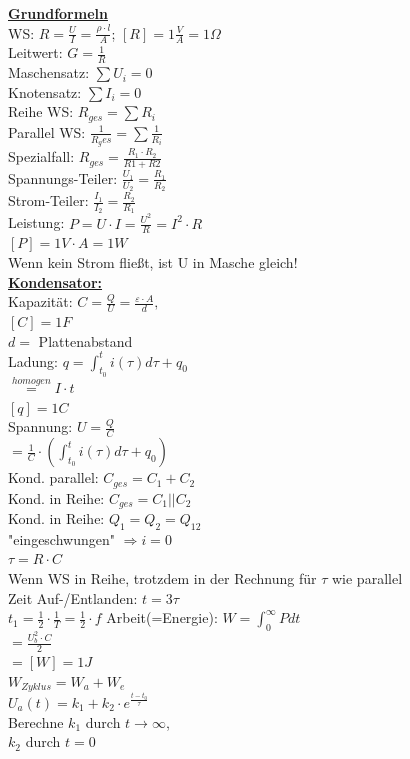 \documentclass[11pt]{article}
\begin{document}
\begin{minipage}{0.45\textwidth}

\underline{\textbf{Grundformeln}}\\
WS: $R = \frac{U}{I} = \frac{\rho \cdot l}{A}$; $[R] = 1\frac{V}{A} =1 \Omega$\\
Leitwert: $G = \frac{1}{R}$\\
Maschensatz: $\sum U_i = 0$\\
Knotensatz: $\sum I_i = 0$\\
Reihe WS: $R_{ges} = \sum R_i$\\
Parallel WS: $\frac{1}{R_ges} = \sum \frac{1}{R_i}$\\
\phantom{ss} Spezialfall: $R_{ges} = \frac{R_1 \cdot R_2}{R1+R2} $\\
Spannungs-Teiler: $\frac{U_1}{U_2} = \frac{R_1}{R_2}$\\
Strom-Teiler: $\frac{I_1}{I_2} = \frac{R_2}{R_1}$\\
Leistung: $P =U \cdot I = \frac{U^2}{R} = I^2 \cdot R $ \\
\phantom{ssssssssss} $[P] = 1V \cdot A =1 W$\\
Wenn kein Strom fließt, ist U in Masche gleich!\\

\underline{\textbf{Kondensator:}}\\
Kapazität: $C = \frac{Q}{U} = \frac{\varepsilon \cdot A }{d},$\\
\phantom{ssssssssssii} $[C]=1F$\\
\phantom{sssssssssssii} $d =$ Plattenabstand\\
Ladung: $q = \int_{t_0}^t i(\tau) d\tau + q_0$\\
\phantom{sssssssis} $\stackrel{homogen}{=} I \cdot t$\\
\phantom{ssssssssssii} $[q]=1C$\\
Spannung: $U = \frac{Q}{C}$\\
\phantom{ssi} $= \frac{1}{C} \cdot (\int_{t_0}^t i(\tau) d\tau + q_0)$\\
Kond. parallel: $C_{ges} = C_1 + C_2$\\
Kond. in Reihe: $C_{ges} = C_1 || C_2$\\
Kond. in Reihe: $Q_1 = Q_2 = Q_{12}$\\
"eingeschwungen" $\Rightarrow i = 0$\\
$\tau = R \cdot C$\\
Wenn WS in Reihe, trotzdem in der Rechnung für $\tau$ wie parallel\\
Zeit Auf-/Entlanden: $t = 3\tau$\\
$t_1 = \frac{1}{2} \cdot \frac{1}{T} = \frac{1}{2} \cdot f$
Arbeit(=Energie): $W = \int_0^\infty P dt$\\
\phantom{sssssssss} $= \frac{U_b^2 \cdot C}{2} $\\
\phantom{sssssssss} $= [W] = 1J $\\
$W_{Zyklus} = W_a + W_e$\\
$U_a(t) = k_1 + k_2 \cdot e^{\frac{t-t_0}{\tau}}$\\
Berechne $k_1$ durch $t \rightarrow \infty$,\\
$k_2$ durch $t = 0$\\


\end{minipage}
\end{document}
